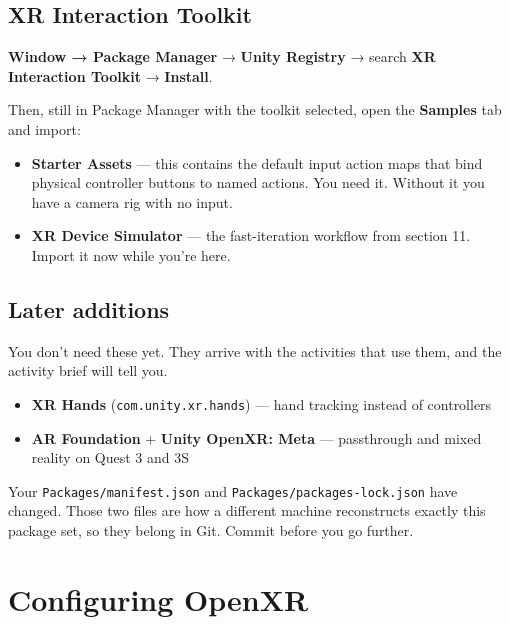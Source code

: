 \documentclass[11pt,a4paper]{article}
\providecommand{\tightlist}{\setlength{\itemsep}{2pt}\setlength{\parskip}{0pt}}
\begin{document}
\subsection{XR Interaction Toolkit}\label{xr-interaction-toolkit}

\textbf{Window → Package Manager} → \textbf{Unity Registry} → search \textbf{XR Interaction Toolkit} →
\textbf{Install}.

Then, still in Package Manager with the toolkit selected, open the \textbf{Samples} tab and
import:

\begin{itemize}
\tightlist
\item
  \textbf{Starter Assets} --- this contains the default input action maps that bind physical
  controller buttons to named actions. You need it. Without it you have a camera rig with
  no input.
\item
  \textbf{XR Device Simulator} --- the fast-iteration workflow from section 11. Import it now
  while you're here.
\end{itemize}

\subsection{Later additions}\label{later-additions}

You don't need these yet. They arrive with the activities that use them, and the
activity brief will tell you.

\begin{itemize}
\tightlist
\item
  \textbf{XR Hands} (\texttt{com.unity.xr.hands}) --- hand tracking instead of controllers
\item
  \textbf{AR Foundation} + \textbf{Unity OpenXR: Meta} --- passthrough and mixed reality on Quest 3
  and 3S
\end{itemize}

\begin{keybox}
Your \texttt{Packages/manifest.json} and \texttt{Packages/packages-lock.json} have
changed. Those two files are how a different machine reconstructs exactly this package
set, so they belong in Git. Commit before you go further.
\end{keybox}


\section{Configuring OpenXR}\label{configuring-openxr}
\end{document}
